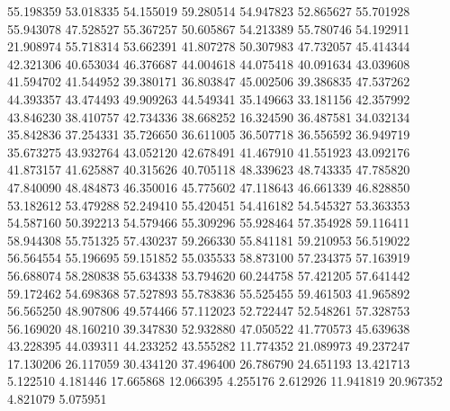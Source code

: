 55.198359
53.018335
54.155019
59.280514
54.947823
52.865627
55.701928
55.943078
47.528527
55.367257
50.605867
54.213389
55.780746
54.192911
21.908974
55.718314
53.662391
41.807278
50.307983
47.732057
45.414344
42.321306
40.653034
46.376687
44.004618
44.075418
40.091634
43.039608
41.594702
41.544952
39.380171
36.803847
45.002506
39.386835
47.537262
44.393357
43.474493
49.909263
44.549341
35.149663
33.181156
42.357992
43.846230
38.410757
42.734336
38.668252
16.324590
36.487581
34.032134
35.842836
37.254331
35.726650
36.611005
36.507718
36.556592
36.949719
35.673275
43.932764
43.052120
42.678491
41.467910
41.551923
43.092176
41.873157
41.625887
40.315626
40.705118
48.339623
48.743335
47.785820
47.840090
48.484873
46.350016
45.775602
47.118643
46.661339
46.828850
53.182612
53.479288
52.249410
55.420451
54.416182
54.545327
53.363353
54.587160
50.392213
54.579466
55.309296
55.928464
57.354928
59.116411
58.944308
55.751325
57.430237
59.266330
55.841181
59.210953
56.519022
56.564554
55.196695
59.151852
55.035533
58.873100
57.234375
57.163919
56.688074
58.280838
55.634338
53.794620
60.244758
57.421205
57.641442
59.172462
54.698368
57.527893
55.783836
55.525455
59.461503
41.965892
56.565250
48.907806
49.574466
57.112023
52.722447
52.548261
57.328753
56.169020
48.160210
39.347830
52.932880
47.050522
41.770573
45.639638
43.228395
44.039311
44.233252
43.555282
11.774352
21.089973
49.237247
17.130206
26.117059
30.434120
37.496400
26.786790
24.651193
13.421713
5.122510
4.181446
17.665868
12.066395
4.255176
2.612926
11.941819
20.967352
4.821079
5.075951
